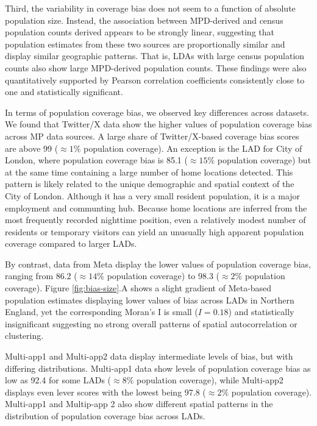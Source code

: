 \documentclass[]{rsos}%
\begin{document}
Third, the variability in coverage bias does not seem to a function of
absolute population size. Instead, the association between MPD-derived and census population
counts derived appears to be strongly linear, suggesting that population estimates from these two sources are proportionally similar and display similar geographic patterns. That is, LDAs with large census population counts also show large MPD-derived population counts. These findings were also quantitatively supported by Pearson correlation
coefficients consistently close to one and statistically significant.

In terms of population coverage bias, we observed
key differences across datasets. We found that Twitter/X data show the
higher values of population coverage bias across MP data sources.
A large share of Twitter/X-based coverage bias scores are
above 99 (\(\approx 1 \%\) population coverage). An exception is the LAD
for City of London, where population coverage bias is 85.1
(\(\approx 15 \%\) population coverage) but at the same time containing a large number of home
locations detected.
This pattern is likely related to the unique
demographic and spatial context of the City of London. Although it has a
very small resident population, it is a major employment and communting hub. Because home locations are inferred from the most frequently
recorded nighttime position, even a relatively modest number
of residents or temporary visitors can yield an unusually high apparent
population coverage compared to larger LADs.

By contrast, data from Meta
display the lower values of population coverage bias, ranging from
86.2 (\(\approx 14 \%\) population coverage) to 98.3 (\(\approx 2 \%\)
population coverage). Figure \ref{fig:bias-size}.A shows a slight gradient of Meta-based population estimates displaying lower values of bias across LADs in Northern England, yet
the corresponding Moran's I is small
(\(I = 0.18\)) and statistically insignificant suggesting no strong overall patterns of spatial autocorrelation or clustering.

Multi-app1 and
Multi-app2 data display intermediate levels of bias, but with differing
distributions.
Multi-app1 data show levels of population
coverage bias as low as 92.4 for some LADs (\(\approx 8 \%\) population
coverage), while Multi-app2 displays even lever scores with the lowest being 97.8 (\(\approx 2\%\) population coverage).
Multi-app1 and Multip-app 2 also show different spatial patterns in the
distribution of population coverage bias across LADs.
\end{document}
